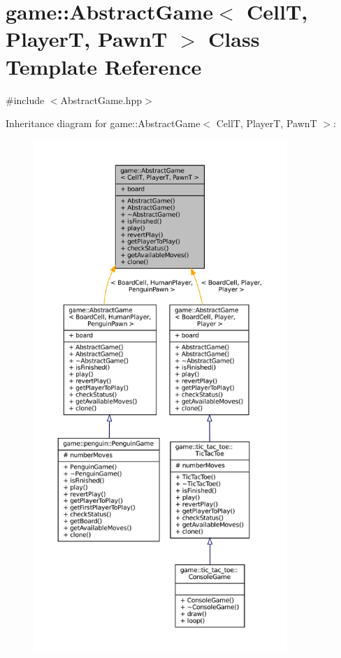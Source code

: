 \hypertarget{classgame_1_1_abstract_game}{}\section{game\+:\+:Abstract\+Game$<$ CellT, PlayerT, PawnT $>$ Class Template Reference}
\label{classgame_1_1_abstract_game}


{\ttfamily \#include $<$Abstract\+Game.\+hpp$>$}



Inheritance diagram for game\+:\+:Abstract\+Game$<$ CellT, PlayerT, PawnT $>$\+:
\nopagebreak
\begin{figure}[H]
\begin{center}
\leavevmode
\includegraphics[height=550pt]{classgame_1_1_abstract_game__inherit__graph}
\end{center}
\end{figure}


